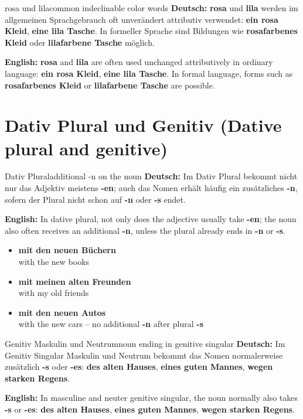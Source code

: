 \documentclass[a4paper,11pt]{article}
\newcommand{\GermanText}[1]{\textbf{Deutsch: }#1\par}
\newcommand{\EnglishText}[1]{{\small\color{SoftGray}\textbf{English: }#1\par}}
\newcommand{\ExampleItem}[2]{\item \textbf{#1}\\{\small\color{SoftGray}#2}}
\begin{document}
\begin{grammarentry}{rosa und lila}{common indeclinable color words}
\GermanText{\textbf{rosa} und \textbf{lila} werden im allgemeinen Sprachgebrauch oft unverändert attributiv verwendet: \textbf{ein rosa Kleid}, \textbf{eine lila Tasche}. In formeller Sprache sind Bildungen wie \textbf{rosafarbenes Kleid} oder \textbf{lilafarbene Tasche} möglich.}
\EnglishText{\textbf{rosa} and \textbf{lila} are often used unchanged attributively in ordinary language: \textbf{ein rosa Kleid}, \textbf{eine lila Tasche}. In formal language, forms such as \textbf{rosafarbenes Kleid} or \textbf{lilafarbene Tasche} are possible.}
\end{grammarentry}

\section{Dativ Plural und Genitiv \textnormal{(Dative plural and genitive)}}

\begin{grammarentry}{Dativ Plural}{additional -n on the noun}
\GermanText{Im Dativ Plural bekommt nicht nur das Adjektiv meistens \textbf{-en}; auch das Nomen erhält häufig ein zusätzliches \textbf{-n}, sofern der Plural nicht schon auf \textbf{-n} oder \textbf{-s} endet.}
\EnglishText{In dative plural, not only does the adjective usually take \textbf{-en}; the noun also often receives an additional \textbf{-n}, unless the plural already ends in \textbf{-n} or \textbf{-s}.}
\end{grammarentry}

\begin{exbox}
\begin{itemize}
\ExampleItem{mit den neuen Büchern}{with the new books}
\ExampleItem{mit meinen alten Freunden}{with my old friends}
\ExampleItem{mit den neuen Autos}{with the new cars -- no additional \textbf{-n} after plural \textbf{-s}}
\end{itemize}
\end{exbox}

\begin{grammarentry}{Genitiv Maskulin und Neutrum}{noun ending in genitive singular}
\GermanText{Im Genitiv Singular Maskulin und Neutrum bekommt das Nomen normalerweise zusätzlich \textbf{-s} oder \textbf{-es}: \textbf{des alten Hauses}, \textbf{eines guten Mannes}, \textbf{wegen starken Regens}.}
\EnglishText{In masculine and neuter genitive singular, the noun normally also takes \textbf{-s} or \textbf{-es}: \textbf{des alten Hauses}, \textbf{eines guten Mannes}, \textbf{wegen starken Regens}.}
\end{grammarentry}
\end{document}
